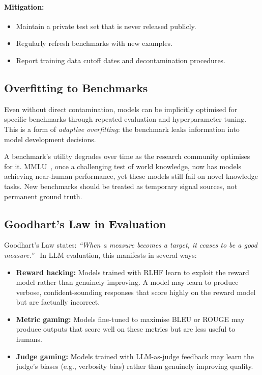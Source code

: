 \paragraph{Mitigation:}
\label{mitigation}

\begin{itemize}
  \item Maintain a private test set that is never released publicly.
  \item Regularly refresh benchmarks with new examples.
  \item Report training data cutoff dates and decontamination procedures.
\end{itemize}

\subsection{Overfitting to Benchmarks}
\label{overfitting-to-benchmarks}

Even without direct contamination, models can be implicitly optimised for specific benchmarks through repeated evaluation and hyperparameter tuning. This is a form of \emph{adaptive overfitting}: the benchmark leaks information into model development decisions.

\begin{warningbox}
A benchmark’s utility degrades over time as the research community optimises for it. MMLU~\cite{hendrycks2021measuring}, once a challenging test of world knowledge, now has models achieving near-human performance, yet these models still fail on novel knowledge tasks. New benchmarks should be treated as temporary signal sources, not permanent ground truth.
\end{warningbox}

\subsection{Goodhart’s Law in Evaluation}
\label{goodharts-law-in-evaluation}

Goodhart’s Law states: \emph{``When a measure becomes a target, it ceases to be a good measure.''}~\cite{goodhart1984problems} In LLM evaluation, this manifests in several ways:

\begin{itemize}
  \item \textbf{Reward hacking:} Models trained with RLHF learn to exploit the reward model rather than genuinely improving. A model may learn to produce verbose, confident-sounding responses that score highly on the reward model but are factually incorrect.
  \item \textbf{Metric gaming:} Models fine-tuned to maximise BLEU or ROUGE may produce outputs that score well on these metrics but are less useful to humans.
  \item \textbf{Judge gaming:} Models trained with LLM-as-judge feedback may learn the judge’s biases (e.g., verbosity bias) rather than genuinely improving quality.
\end{itemize}

